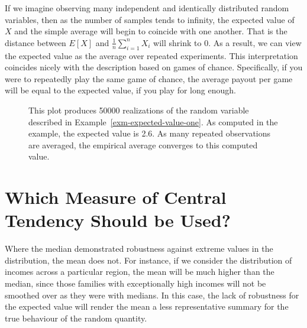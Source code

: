 \documentclass[
  letterpaper,
  DIV=11,
  numbers=noendperiod]{scrreprt}
\theoremstyle{definition}
\theoremstyle{definition}
\theoremstyle{definition}
\theoremstyle{remark}
\begin{document}
If we imagine observing many independent and identically distributed
random variables, then as the number of samples tends to infinity, the
expected value of \(X\) and the simple average will begin to coincide
with one another. That is the distance between \(E[X]\) and
\(\frac{1}{n}\sum_{i=1}^n X_i\) will shrink to \(0\). As a result, we
can view the expected value as the average over repeated experiments.
This interpretation coincides nicely with the description based on games
of chance. Specifically, if you were to repeatedly play the same game of
chance, the average payout per game will be equal to the expected value,
if you play for long enough.

\begin{figure}[H]

\caption{\label{fig-plot}This plot produces 50000 realizations of the
random variable described in Example~\ref{exm-expected-value-one}. As
computed in the example, the expected value is 2.6. As many repeated
observations are averaged, the empirical average converges to this
computed value.}


\end{figure}%

\section{Which Measure of Central Tendency Should be
Used?}\label{which-measure-of-central-tendency-should-be-used}

Where the median demonstrated robustness against extreme values in the
distribution, the mean does not. For instance, if we consider the
distribution of incomes across a particular region, the mean will be
much higher than the median, since those families with exceptionally
high incomes will not be smoothed over as they were with medians. In
this case, the lack of robustness for the expected value will render the
mean a less representative summary for the true behaviour of the random
quantity.
\end{document}
